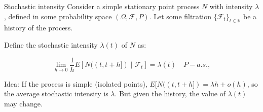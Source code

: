 \documentclass[aspectratio=169]{beamer}
\begin{document}
\begin{frame}{Stochastic intensity}
	Consider a simple stationary point process $N$ with intensity $\lambda$, defined in some probability space $(\Omega, \mathcal{F},P)$. Let some filtration $\{\mathcal{F}_t\}_{t\in\mathbb{R}}$ be a \alert{history} of the process.

	\bigskip

	Define the \alert{stochastic intensity} $\lambda(t)$ of $N$ as:

	\begin{equation*}
		\lim_{h\to 0} \frac{1}{h}E[N((t,t+h])\mid \mathcal{F}_t] = \lambda(t) \quad P-a.s.,
	\end{equation*}

	\bigskip
	\alert{Idea:} If the process is simple (isolated points), $E[N((t,t+h]) = \lambda h + o(h)$, so the \alert{average} stochastic intensity is $\lambda$. But given the history, the value of $\lambda(t)$ may change.


\end{frame}






\end{document}
